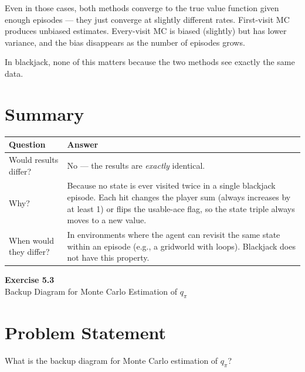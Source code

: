 \documentclass[11pt]{article}
\begin{document}
Even in those cases, both methods converge to the true value function given enough episodes --- they just converge at slightly different rates. First-visit MC produces unbiased estimates. Every-visit MC is biased (slightly) but has lower variance, and the bias disappears as the number of episodes grows.

In blackjack, none of this matters because the two methods see exactly the same data.

\section*{Summary}

\begin{table}[ht]
    \centering
    \begin{tabular}{p{} p{}}
        \toprule
        \textbf{Question} & \textbf{Answer} \\
        \midrule
        Would results differ? & No --- the results are \textit{exactly} identical. \\
        \addlinespace
        Why? & Because no state is ever visited twice in a single blackjack episode. Each hit changes the player sum (always increases by at least 1) or flips the usable-ace flag, so the state triple always moves to a new value. \\
        \addlinespace
        When would they differ? & In environments where the agent can revisit the same state within an episode (e.g., a gridworld with loops). Blackjack does not have this property. \\
        \bottomrule
    \end{tabular}
\end{table}

\newpage

\begin{center}
    {\Large\color{garnet}\textbf{Exercise 5.3}}\\[6pt]
    {\large Backup Diagram for Monte Carlo Estimation of $q_\pi$}
\end{center}

\section*{Problem Statement}

What is the backup diagram for Monte Carlo estimation of $q_\pi$?
\end{document}
